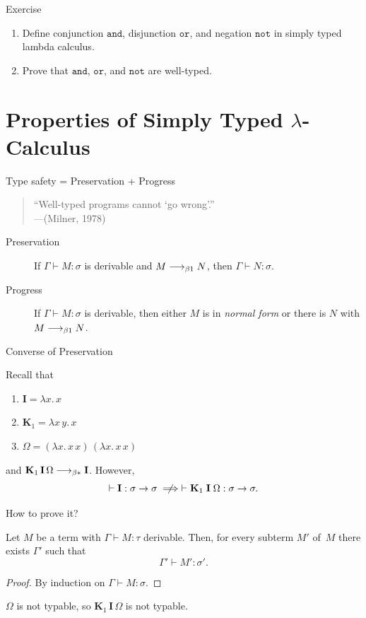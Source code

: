 \begin{frame}{Exercise}
  \begin{enumerate}
    \item Define conjunction $\mathtt{and}$, disjunction $\mathtt{or}$, and
      negation $\mathtt{not}$ in simply typed lambda calculus.

    \item Prove that $\mathtt{and}$, $\mathtt{or}$, and $\mathtt{not}$ are well-typed.
  \end{enumerate}
  
\end{frame}


\section{Properties of Simply Typed $\lambda$-Calculus}


\begin{frame}[c]{Type safety = Preservation + Progress}

\begin{quote}
  ``Well-typed programs cannot `go wrong'.''\\
  \hfill ---(Milner, 1978)
\end{quote}

\begin{description}
  \item[Preservation] If $\Gamma \vdash M : \sigma$ is derivable and $M \longrightarrow_{\beta1} N$, then $\Gamma \vdash N : \sigma$.
  \item[Progress] If $\Gamma \vdash M : \sigma$ is derivable, then either $M$ is in \emph{normal form} or there is $N$ with $M \longrightarrow_{\beta1} N$.
\end{description}

\end{frame}

\begin{frame}[allowframebreaks]{Converse of Preservation}
\begin{example}
  Recall that 
  \begin{enumerate}
    \item $\mathbf{I} = \lambda x.\, x$
    \item $\mathbf{K}_1 = \lambda x\,y.\, x$
    \item $\Omega = (\lambda x.\, x\,x)\,(\lambda x.\, x\,x)$
  \end{enumerate}
  and $\mathbf{K}_1\,\mathbf{I}\,\Omega \longrightarrow_{\beta*} \mathbf{I}$. However, 
  \[
    \vdash \mathbf{I} : \sigma \to \sigma
    \notimplies
    \vdash \mathbf{K}_1\;\mathbf{I}\;\Omega : \sigma \to \sigma.
  \]
\end{example}
How to prove it?
\framebreak
\begin{lemma}
  Let $M$ be a term with $\Gamma \vdash M : \tau$ derivable. Then, for every
  subterm $M'$ of~$M$ there exists $\Gamma'$ such that
  \[
    \Gamma' \vdash M' : \sigma'.
  \]
\end{lemma}
\begin{proof}
  By induction on $\Gamma \vdash M : \sigma$.
\end{proof}
  $\Omega$ is not typable, so $\mathbf{K}_1\,\mathbf{I}\,\Omega$ is not typable.
\end{frame}

